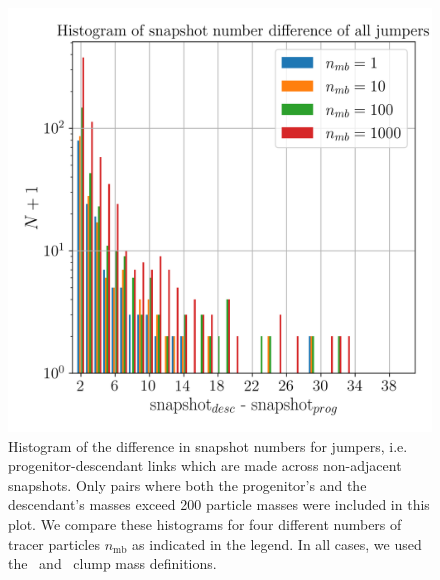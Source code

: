 \begin{figure}
  \centering
  \includegraphics[width=.7\linewidth, keepaspectratio]
	{figures/ACACIA/tree-statistics-my-threshold/jumper_distance-ntrace.png}%
  \caption{ Histogram of the difference in snapshot numbers for
    jumpers, i.e.  progenitor-descendant links which are made across
    non-adjacent snapshots.  Only pairs where both the progenitor's
    and the descendant's masses exceed 200 particle masses were
    included in this plot.  We compare these histograms for four
    different numbers of tracer particles $n_{\mathrm{mb}}$ as indicated in
    the legend.  In all cases, we used the \exc\ and \sad\ clump mass
    definitions.
  }%
  \label{fig:jumper-distances}
\end{figure}

